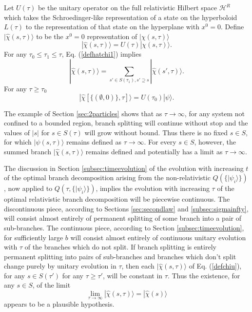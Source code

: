 \documentclass[12pt,amsmath,amssymb,onecolumn]{revtex4-2}
\begin{document}
Let $U(\tau)$ be the unitary operator on the
full relativistic Hilbert space $\mathcal{H}^R$ which takes
the Schroedinger-like representation of a state on the hyperboloid
$L(\tau)$ to the representation of that state
on the hyperplane with $x^0 = 0$.
Define $|\hat{\chi}(s, \tau) \rangle $ to be
the $x^0 = 0$ representation
of $|\chi( s, \tau) \rangle $
  \begin{equation}
    \label{defchiu}
    |\hat{\chi}( s, \tau) \rangle  =  U(\tau) |\chi( s, \tau) \rangle .
  \end{equation}
For any $\tau_0 \le \tau_1 \le \tau$,  
Eq. (\ref{defhatchi1}) implies
\begin{equation}
  \label{defhatchi2}
  |\hat{\chi}(s, \tau) \rangle  = \sum_{s' \in S(\tau_1), s' \supseteq s}| \hat{\chi}( s', \tau) \rangle .
\end{equation}
For any $\tau \ge \tau_0$
\begin{equation}
  \label{psih}
  |\hat{\chi}[ \{( \emptyset, 0)\}, \tau] \rangle  = U(\tau_0) |\psi \rangle .
\end{equation}



The example of Section \ref{sec:2particles}
shows that as $\tau \rightarrow \infty$, for any system
not confined to a bounded region, branch splitting
will continue without stop and the
values of $|s|$ for $s \in S(\tau)$ will
grow without bound. Thus there is no fixed $s \in S$,
for which $|\psi( s, \tau) \rangle $ remains defined as
$\tau \rightarrow \infty$.
For every $s \in S$, however, the summed branch
$|\hat\chi( s, \tau) \rangle $ remains defined and 
potentially has a limit as $\tau \rightarrow \infty$.

The discussion in
Section \ref{subsec:timeevolution} of the evolution
with increasing $t$
of the optimal branch decomposition arising from 
the non-relativistic $Q(\{|\psi_i \rangle \})$, now
applied to $Q(\tau, \{|\psi_i \rangle \})$, implies
the evolution with increasing $\tau$
of the optimal relativistic branch decomposition
will be piecewise continuous.
The discontinuous piece, according to
Sections \ref{sec:secondlaw} and \ref{subsec:sigmainfty},
will consist almost entirely of permanent
splitting of some branch into a pair of
sub-branches. The continuous
piece, according to Section \ref{subsec:timeevolution},
for sufficiently large $b$
will consist almost entirely of continuous unitary
evolution with $\tau$ of the branches which do not split.
If branch splitting is entirely permanent splitting
into pairs of sub-branches and branches which
don't split change purely by unitary evolution in
$\tau$, then each $|\hat{\chi}(s, \tau) \rangle $ of
Eq. (\ref{defchiu}),
for any $s \in S( \tau')$ for any $\tau \ge \tau'$, will be
constant in $\tau$.
Thus the existence, for any $s \in S$, of the limit
\begin{equation}
  \label{chihat}
  \lim_{\tau \rightarrow \infty} |\hat{\chi}(s, \tau) \rangle  = |\hat{\chi}(s) \rangle 
\end{equation}
appears to be a plausible hypothesis.
\end{document}

